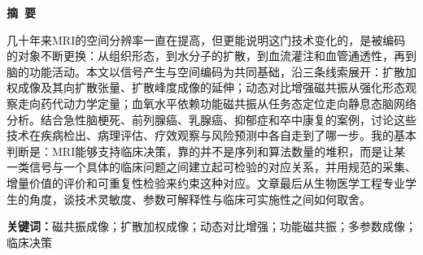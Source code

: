 \cleardoublepage
\begin{center}
    \bfseries {} 摘~要
\end{center}

\vskip 6pt

几十年来MRI的空间分辨率一直在提高，但更能说明这门技术变化的，是被编码的对象不断更换：从组织形态，到水分子的扩散，到血流灌注和血管通透性，再到脑的功能活动。本文以信号产生与空间编码为共同基础，沿三条线索展开：扩散加权成像及其向扩散张量、扩散峰度成像的延伸；动态对比增强磁共振从强化形态观察走向药代动力学定量；血氧水平依赖功能磁共振从任务态定位走向静息态脑网络分析。结合急性脑梗死、前列腺癌、乳腺癌、抑郁症和卒中康复的案例，讨论这些技术在疾病检出、病理评估、疗效观察与风险预测中各自走到了哪一步。我的基本判断是：MRI能够支持临床决策，靠的并不是序列和算法数量的堆积，而是让某一类信号与一个具体的临床问题之间建立起可检验的对应关系，并用规范的采集、增量价值的评价和可重复性检验来约束这种对应。文章最后从生物医学工程专业学生的角度，谈技术灵敏度、参数可解释性与临床可实施性之间如何取舍。

\vskip 12mm

\noindent\textbf{关键词：}磁共振成像；扩散加权成像；动态对比增强；功能磁共振；多参数成像；临床决策

